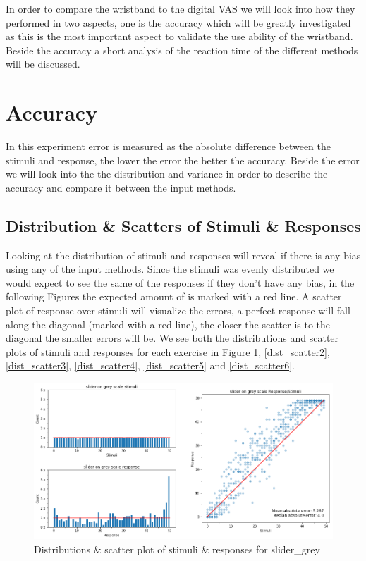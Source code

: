 In order to compare the wristband to the digital VAS we will look into how they performed in two aspects, one is the accuracy which will be greatly investigated as this is the most important aspect to validate the use ability of the wristband. Beside the accuracy a short analysis of the reaction time of the different methods will be discussed.

\section{Accuracy}
In this experiment error is measured as the absolute difference between the stimuli and response, the lower the error the better the accuracy. Beside the error we will look into the the distribution and variance in order to describe the accuracy and compare it between the input methods. 


\subsection{Distribution \& Scatters of Stimuli \& Responses}
Looking at the distribution of stimuli and responses will reveal if there is any bias using any of the input methods. Since the stimuli was evenly distributed we would expect to see the same of the responses if they don't have any bias, in the following Figures the expected amount of is marked with a red line. A scatter plot of response over stimuli will visualize the errors, a perfect response will fall along the diagonal (marked with a red line), the closer the scatter is to the diagonal the smaller errors will be. We see both the distributions and scatter plots of stimuli and responses for each exercise in Figure \ref{dist_scatter1}, \ref{dist_scatter2}, \ref{dist_scatter3}, \ref{dist_scatter4}, \ref{dist_scatter5} and \ref{dist_scatter6}.


\begin{figure}[p]
    \centering
    \includegraphics[width=1.2\textwidth]{figures/dist_scatter1.png}
    \caption{Distributions \& scatter plot of stimuli \& responses for slider\_grey}
    \label{dist_scatter1}
\end{figure}

